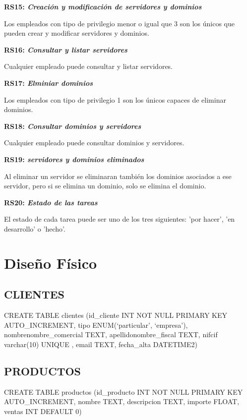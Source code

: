 \documentclass[paper=a4, fontsize=11pt, spanish]{scrartcl}
\begin{document}
\setlength{\parindent}{0em}
\textbf{RS15: \textit{Creación y modificación de servidores y dominios}}
\setlength{\parindent}{2em}

Los empleados con tipo de privilegio menor o igual que 3 son los únicos que pueden crear y modificar servidores y dominios.

\setlength{\parindent}{0em}
\textbf{RS16: \textit{Consultar y listar servidores}}
\setlength{\parindent}{2em}

Cualquier empleado puede consultar y listar servidores.

\setlength{\parindent}{0em}
\textbf{RS17: \textit{Elminiar dominios}}
\setlength{\parindent}{2em}

Los empleados con tipo de privilegio 1 son los únicos capaces de eliminar dominios.

\setlength{\parindent}{0em}
\textbf{RS18: \textit{Consultar dominios y servidores}}
\setlength{\parindent}{2em}

Cualquier empleado puede consultar dominios y servidores.

\setlength{\parindent}{0em}
\textbf{RS19: \textit{servidores y dominios eliminados}}
\setlength{\parindent}{2em}

Al eliminar un servidor se eliminaran también los dominios asociados a ese servidor, pero si se elimina un dominio, solo se elimina el dominio.

\setlength{\parindent}{0em}
\textbf{RS20: \textit{Estado de las tareas}}
\setlength{\parindent}{2em}

El estado de cada tarea puede ser uno de los tres siguientes: 'por hacer', 'en desarrollo' o 'hecho'.

\section{Diseño Físico}
\subsection{CLIENTES}
CREATE TABLE clientes (id\_cliente INT NOT NULL PRIMARY KEY AUTO\_INCREMENT, tipo ENUM(‘particular’, ‘empresa’),  nombre\/nombre\_comercial TEXT,  apellido\/nombre\_fiscal TEXT, nif\/cif varchar(10) UNIQUE , email TEXT, fecha\_alta DATETIME2)

\subsection{PRODUCTOS}
CREATE TABLE productos (id\_producto INT NOT NULL PRIMARY KEY AUTO\_INCREMENT, nombre TEXT,  descripcion TEXT,  importe FLOAT, ventas INT DEFAULT 0)
\end{document}
